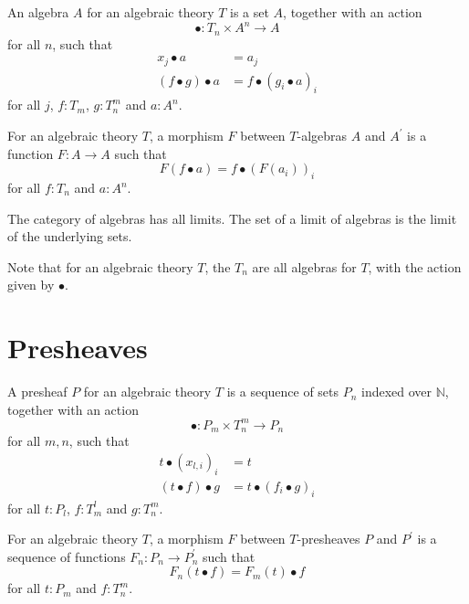 \begin{definition}[algebra]
  An algebra $ A $ for an algebraic theory $ T $ is a set $ A $, together with an action
  \[ \bullet: T_n \times A^n \to A \]
  for all $ n $, such that
  \begin{align*}
    x_j \bullet a &= a_j\\
    (f \bullet g) \bullet a &= f \bullet (g_i \bullet a)_i
  \end{align*}
  for all $ j $, $ f: T_m $, $ g: T_n^m $ and $ a: A^n $.
\end{definition}

\begin{definition}
  For an algebraic theory $ T $, a morphism $ F $ between $ T $-algebras $ A $ and $ A^\prime $ is a function $ F: A \to A $ such that
  \[ F(f \bullet a) = f \bullet (F(a_i))_i \]
  for all $ f: T_n $ and $ a: A^n $.
\end{definition}

\begin{remark}
  The category of algebras has all limits. The set of a limit of algebras is the limit of the underlying sets.
\end{remark}

\begin{remark}
  Note that for an algebraic theory $ T $, the $ T_n $ are all algebras for $ T $, with the action given by $ \bullet $.
\end{remark}

\section{Presheaves}

\begin{definition}[presheaf]
  A presheaf $ P $ for an algebraic theory $ T $ is a sequence of sets $ P_n $ indexed over $ \mathbb N $, together with an action
  \[ \bullet: P_m \times T_n^m \to P_n \]
  for all $ m, n $, such that
  \begin{align*}
    t \bullet (x_{l, i})_i &= t\\
    (t \bullet f) \bullet g &= t \bullet (f_i \bullet g)_i
  \end{align*}
  for all $ t: P_l $, $ f: T_m^l $ and $ g: T_n^m $.
\end{definition}

\begin{definition}
  For an algebraic theory $ T $, a morphism $ F $ between $ T $-presheaves $ P $ and $ P^\prime $ is a sequence of functions $ F_n: P_n \to P^\prime_n $ such that
  \[ F_n(t \bullet f) = F_m(t) \bullet f \]
  for all $ t: P_m $ and $ f: T_n^m $.
\end{definition}

